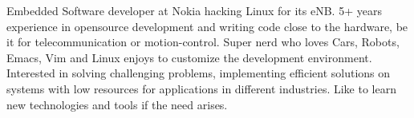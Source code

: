 

\begin{cvparagraph}

Embedded Software developer at Nokia hacking Linux for its eNB. 5+ years experience in opensource development and writing code close to the hardware, be it for telecommunication or motion-control. Super nerd who loves Cars, Robots, Emacs, Vim and Linux enjoys to customize the development environment. Interested in solving challenging problems, implementing efficient solutions on systems with low resources for applications in different industries. Like to learn new technologies and tools if the need arises.
\end{cvparagraph}
